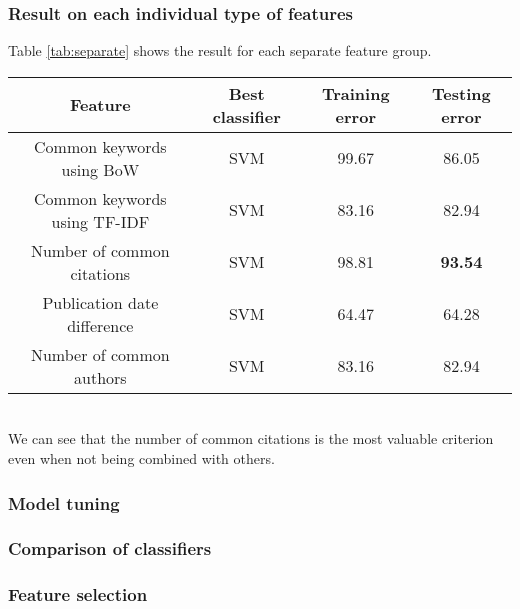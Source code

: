 \documentclass{article}
\begin{document}
\subsubsection{Result on each individual type of features}
Table \ref{tab:separate} shows the result for each separate feature group.
\begin{table*}[ht]
	\label{tab:separate}
	\centering
	\caption{Performance on each separate feature groups (in $\%$)}
	\begin{tabular}{|c|c|c|c|} \hline
		Feature&Best classifier&Training error&Testing error\\ \hline
		Common keywords using BoW&SVM&99.67&86.05\\ \hline
		Common keywords using TF-IDF&SVM&83.16&82.94\\ \hline
		Number of common citations&SVM&98.81&\textbf{93.54}\\ \hline
		Publication date difference&SVM&64.47&64.28\\ \hline
		Number of common authors&SVM&83.16&82.94\\ \hline
	\end{tabular}
\end{table*}\\
We can see that the number of common citations is the most valuable criterion even when not being combined with others.
\subsubsection{Model tuning}
\subsubsection{Comparison of classifiers}
\subsubsection{Feature selection}
\end{document}
